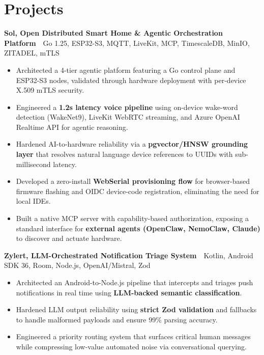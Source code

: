 \documentclass[10pt, letterpaper]{article}
\newcommand{\resumeProject}[2]{
  \noindent\textbf{#1}\ {\small\textperiodcentered\ #2}
}
\begin{document}
\vspace{1pt}

\section{Projects}
\resumeProject{Sol, Open Distributed Smart Home \& Agentic Orchestration Platform}{Go 1.25, ESP32-S3, MQTT, LiveKit, MCP, TimescaleDB, MinIO, ZITADEL, mTLS}
\begin{itemize}
  \item Architected a 4-tier agentic platform featuring a Go control plane and ESP32-S3 nodes, validated through hardware deployment with per-device X.509 mTLS security.
  \item Engineered a \textbf{1.2s latency voice pipeline} using on-device wake-word detection (WakeNet9), LiveKit WebRTC streaming, and Azure OpenAI Realtime API for agentic reasoning.
  \item Hardened AI-to-hardware reliability via a \textbf{pgvector/HNSW grounding layer} that resolves natural language device references to UUIDs with sub-millisecond latency.
  \item Developed a zero-install \textbf{WebSerial provisioning flow} for browser-based firmware flashing and OIDC device-code registration, eliminating the need for local IDEs.
  \item Built a native MCP server with capability-based authorization, exposing a standard interface for \textbf{external agents (OpenClaw, NemoClaw, Claude)} to discover and actuate hardware.
\end{itemize}

\vspace{1pt}
\resumeProject{Zylert, LLM-Orchestrated Notification Triage System}{Kotlin, Android SDK 36, Room, Node.js, OpenAI/Mistral, Zod}
\begin{itemize}
  \item Architected an Android-to-Node.js pipeline that intercepts and triages push notifications in real time using \textbf{LLM-backed semantic classification}.
  \item Hardened LLM output reliability using \textbf{strict Zod validation} and fallbacks to handle malformed payloads and ensure 99\% parsing accuracy.
  \item Engineered a priority routing system that surfaces critical human messages while compressing low-value automated noise via conversational querying.
\end{itemize}
\end{document}
